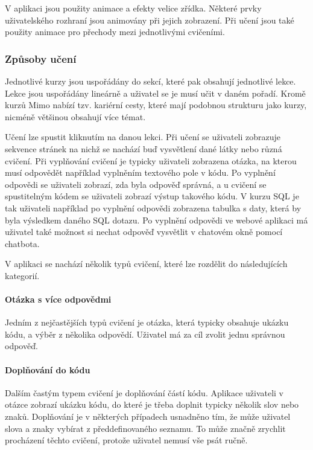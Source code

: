 V aplikaci jsou použity animace a efekty velice zřídka. Některé prvky uživatelského rozhraní jsou animovány při jejich zobrazení. Při učení jsou také použity animace pro přechody mezi jednotlivými cvičeními.

\subsubsection{Způsoby učení}

Jednotlivé kurzy jsou uspořádány do sekcí, které pak obsahují jednotlivé lekce. Lekce jsou uspořádány lineárně a uživatel se je musí učit v daném pořadí. Kromě kurzů Mimo nabízí tzv. kariérní cesty, které mají podobnou strukturu jako kurzy, nicméně většinou obsahují více témat.

Učení lze spustit kliknutím na danou lekci. Při učení se uživateli zobrazuje sekvence stránek na nichž se nachází buď vysvětlení dané látky nebo různá cvičení. Při vyplňování cvičení je typicky uživateli zobrazena otázka, na kterou musí odpovědět například vyplněním textového pole v kódu. Po vyplnění odpovědi se uživateli zobrazí, zda byla odpověď správná, a u cvičení se spustitelným kódem se uživateli zobrazí výstup takového kódu. V kurzu SQL je tak uživateli například po vyplnění odpovědi zobrazena tabulka s daty, která by byla výsledkem daného SQL dotazu. Po vyplnění odpovědi ve webové aplikaci má uživatel také možnost si nechat odpověď vysvětlit v chatovém okně pomocí chatbota.

V aplikaci se nachází několik typů cvičení, které lze rozdělit do následujících kategorií.

\paragraph{Otázka s více odpovědmi} Jedním z nejčastějších typů cvičení je otázka, která typicky obsahuje ukázku kódu, a výběr z několika odpovědí. Uživatel má za cíl zvolit jednu správnou odpověď.

\paragraph{Doplňování do kódu} Dalším častým typem cvičení je doplňování částí kódu. Aplikace uživateli v otázce zobrazí ukázku kódu, do které je třeba doplnit typicky několik slov nebo znaků. Doplňování je v některých případech usnadněno tím, že může uživatel slova a znaky vybírat z předdefinovaného seznamu. To může značně zrychlit procházení těchto cvičení, protože uživatel nemusí vše psát ručně.

